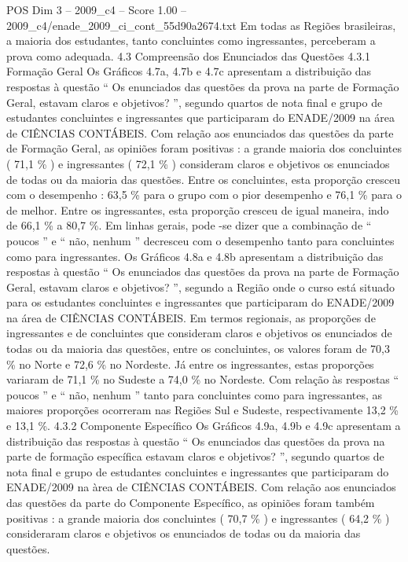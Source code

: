 \begin{textsample}{POS Dim 3 – 2009\_c4 – Score 1.00 – 2009\_c4/enade\_2009\_ci\_cont\_55d90a2674.txt}
Em todas as Regiões brasileiras, a maioria dos estudantes, tanto concluintes como ingressantes, perceberam a prova como adequada. 4.3 Compreensão dos Enunciados das Questões 4.3.1 Formação Geral Os Gráficos 4.7a, 4.7b e 4.7c apresentam a distribuição das respostas à questão “ Os enunciados das questões da prova na parte de Formação Geral, estavam claros e objetivos? ”, segundo quartos de nota final e grupo de estudantes concluintes e ingressantes que participaram do ENADE/2009 na área de CIÊNCIAS CONTÁBEIS.
Com relação aos enunciados das questões da parte de Formação Geral, as opiniões foram positivas : a grande maioria dos concluintes ( 71,1 \% ) e ingressantes ( 72,1 \% ) consideram claros e objetivos os enunciados de todas ou da maioria das questões.
Entre os concluintes, esta proporção cresceu com o desempenho : 63,5 \% para o grupo com o pior desempenho e 76,1 \% para o de melhor.
Entre os ingressantes, esta proporção cresceu de igual maneira, indo de 66,1 \% a 80,7 \%.
Em linhas gerais, pode -se dizer que a combinação de “ poucos ” e “ não, nenhum ” decresceu com o desempenho tanto para concluintes como para ingressantes.
Os Gráficos 4.8a e 4.8b apresentam a distribuição das respostas à questão “ Os enunciados das questões da prova na parte de Formação Geral, estavam claros e objetivos? ”, segundo a Região onde o curso está situado para os estudantes concluintes e ingressantes que participaram do ENADE/2009 na área de CIÊNCIAS CONTÁBEIS.
Em termos regionais, as proporções de ingressantes e de concluintes que consideram claros e objetivos os enunciados de todas ou da maioria das questões, entre os concluintes, os valores foram de 70,3 \% no Norte e 72,6 \% no Nordeste.
Já entre os ingressantes, estas proporções variaram de 71,1 \% no Sudeste a 74,0 \% no Nordeste.
Com relação às respostas “ poucos ” e “ não, nenhum ” tanto para concluintes como para ingressantes, as maiores proporções ocorreram nas Regiões Sul e Sudeste, respectivamente 13,2 \% e 13,1 \%. 4.3.2 Componente Específico Os Gráficos 4.9a, 4.9b e 4.9c apresentam a distribuição das respostas à questão “ Os enunciados das questões da prova na parte de formação específica estavam claros e objetivos? ”, segundo quartos de nota final e grupo de estudantes concluintes e ingressantes que participaram do ENADE/2009 na àrea de CIÊNCIAS CONTÁBEIS.
Com relação aos enunciados das questões da parte do Componente Específico, as opiniões foram também positivas : a grande maioria dos concluintes ( 70,7 \% ) e ingressantes ( 64,2 \% ) consideraram claros e objetivos os enunciados de todas ou da maioria das questões.

\end{textsample}
